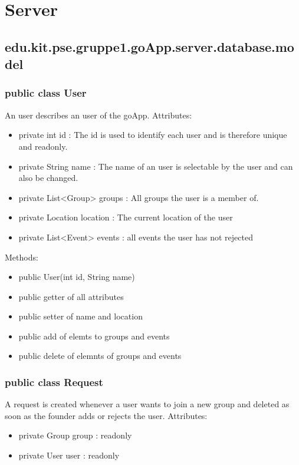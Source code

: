 
\section{Server}
	
	\hypertarget{database.model}{}
	\hypertarget{ServerModel}{}
	\subsection{edu.kit.pse.gruppe1.goApp.server.database.model}

	\subsubsection{public class User}
	An user describes an user of the goApp.
	\newline Attributes:
	\begin{itemize}
	\item private int id : The id is used to identify each user and is therefore unique and readonly.
	\item private String name : The name of an user is selectable by the user and can also be changed.
	\item private List<Group> groups : All groups the user is a member of.
	\item private Location location : The current location of the user
	\item private List<Event> events : all events the user has not rejected
	\end{itemize}
	Methods: 
	\begin{itemize}
	\item public User(int id, String name)
	\item public getter of all attributes
	\item public setter of name and location
	\item public add of elemts to groups and events
	\item public delete of elemnts of groups and events
	\end{itemize}


	\subsubsection{public class Request}
	A request is created whenever a user wants to join a new group and deleted as soon as the founder adds or rejects the user.
	\newline Attributes:
	\begin{itemize}
	\item private Group group : readonly
	\item private User user : readonly
	\end{itemize}
	
